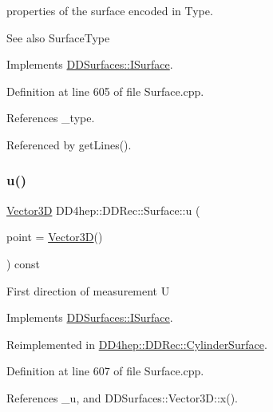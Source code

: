 properties of the surface encoded in Type. \begin{DoxySeeAlso}{See also}
Surface\+Type 
\end{DoxySeeAlso}


Implements \hyperlink{class_d_d_surfaces_1_1_i_surface_aab772d11a61d7ae966d535be0da2a626}{D\+D\+Surfaces\+::\+I\+Surface}.



Definition at line 605 of file Surface.\+cpp.



References \+\_\+type.



Referenced by get\+Lines().

\hypertarget{class_d_d4hep_1_1_d_d_rec_1_1_surface_a1b69829495d4a43178222cc7a5b369da}{}\label{class_d_d4hep_1_1_d_d_rec_1_1_surface_a1b69829495d4a43178222cc7a5b369da} 
\subsubsection{\texorpdfstring{u()}{u()}}
{\footnotesize\ttfamily \hyperlink{class_d_d_surfaces_1_1_vector3_d}{Vector3D} D\+D4hep\+::\+D\+D\+Rec\+::\+Surface\+::u (\begin{DoxyParamCaption}\item[{const \hyperlink{class_d_d_surfaces_1_1_vector3_d}{Vector3D} \&}]{point = {\ttfamily \hyperlink{class_d_d_surfaces_1_1_vector3_d}{Vector3D}()} }\end{DoxyParamCaption}) const\hspace{0.3cm}{\ttfamily [virtual]}}

First direction of measurement U 

Implements \hyperlink{class_d_d_surfaces_1_1_i_surface_a09fd4aa43cc96d50b4b81b94107f7d8f}{D\+D\+Surfaces\+::\+I\+Surface}.



Reimplemented in \hyperlink{class_d_d4hep_1_1_d_d_rec_1_1_cylinder_surface_a8b45bcd7d1ca8b8de3d3e5b509988224}{D\+D4hep\+::\+D\+D\+Rec\+::\+Cylinder\+Surface}.



Definition at line 607 of file Surface.\+cpp.



References \+\_\+u, and D\+D\+Surfaces\+::\+Vector3\+D\+::x().



